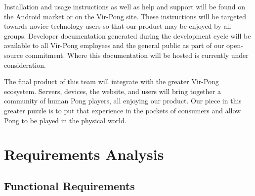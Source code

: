 \documentclass[12pt]{article}
\begin{document}
Installation and usage instructions as well as help and support will be found on the Android market or on the Vir-Pong site.  These instructions will be targeted towards novice technology users so that our product may be enjoyed by all groups.  Developer documentation generated during the development cycle will be available to all Vir-Pong employees and the general public as part of our open-source commitment.  Where this documentation will be hosted is currently under consideration.  

The final product of this team will integrate with the greater Vir-Pong ecosystem.  Servers, devices, the website, and users will bring together a community of human Pong players, all enjoying our product.  Our piece in this greater puzzle is to put that experience in the pockets of consumers and allow Pong to be played in the physical world.


\section{Requirements Analysis}
\subsection{Functional Requirements}

\singlespacing
\end{document}

